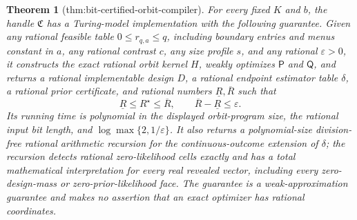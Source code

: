 \documentclass{article}
\newtheorem{theorem}{Theorem}
\begin{document}
\begin{theorem}[thm:bit-certified-orbit-compiler]\label{thm:bit-certified-orbit-compiler}
For every fixed \(K\) and \(b\), the handle \(\mathfrak C\) has a Turing-model implementation with the following guarantee. Given any rational feasible table \(0\le r_{q,a}\le q\), including boundary entries and menus constant in \(a\), any rational contrast \(c\), any size profile \(s\), and any rational \(\varepsilon>0\), it constructs the exact rational orbit kernel \(H\), weakly optimizes \(\mathsf P\) and \(\mathsf Q\), and returns a rational implementable design \(D\), a rational endpoint estimator table \(\delta\), a rational prior certificate, and rational numbers \(\underline R,\overline R\) such that
\[
 \underline R\le R^\star\le\overline R,
 \qquad \overline R-\underline R\le\varepsilon.
\]
Its running time is polynomial in the displayed orbit-program size, the rational input bit length, and \(\log\max\{2,1/\varepsilon\}\). It also returns a polynomial-size division-free rational arithmetic recursion for the continuous-outcome extension of \(\delta\); the recursion detects rational zero-likelihood cells exactly and has a total mathematical interpretation for every real revealed vector, including every zero-design-mass or zero-prior-likelihood face. The guarantee is a weak-approximation guarantee and makes no assertion that an exact optimizer has rational coordinates.
\end{theorem}
\end{document}
